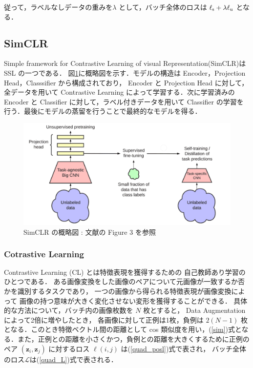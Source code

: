 従って，ラベルなしデータの重みを$\lambda$	として，バッチ全体のロスは ${\ell}_{\rm s}+\lambda {\ell}_{\rm u}$ となる．

\changeindent{0cm}
\subsection{SimCLR}
\changeindent{2cm}
Simple framework for Contrastive Learning of visual Representation(SimCLR)\cite{chen2020simple}は SSL の一つである．
図\ref{fig:SimCLR}に概略図を示す．モデルの構造は Encoder，Projection Head，Classsifier
から構成されており， Encoder と Projection Head に対して，全データを用いて Contrastive Learning によって学習する．次に学習済みの Encoder と Classifier に対して，ラベル付きデータを用いて Classifier の学習を行う．最後にモデルの蒸留\cite{hinton2015distilling}を行うことで最終的なモデルを得る．

\begin{figure}[h]
	\begin{center}
		\includegraphics[scale=1.0]{./images/SimCLR.png}
		\caption[SimCLR の概略図]
		{SimCLR の概略図 : 文献\cite{chen2020big}の Figure 3 を参照\label{fig:SimCLR}}
	\end{center}
\end{figure}

\changeindent{0cm}
\subsubsection{Cotrastive Learning}
\changeindent{2cm}
Contrastive Learning (CL)\cite{tian2020makes} とは特徴表現を獲得するための
自己教師あり学習\cite{doersch2017multi}のひとつである．
ある画像変換をした画像のペアについて元画像が一致するか否かを識別するタスクであり，
一つの画像から得られる特徴表現が画像変換によって
画像の持つ意味が大きく変化させない変形を獲得することができる．
具体的な方法について，バッチ内の画像枚数を $N$ 枚とすると， Data Augmentation によって2倍に増やしたとき，
各画像に対して正例は1枚，負例は $2(N-1)$ 枚となる．このとき特徴ベクトル間の距離として cos 類似度を用い，(\ref{sim})式となる．また，正例との距離を小さくかつ，負例との距離を大きくするために正例のペア $({\bm z}_i,{\bm z}_j)$ に対するロス $\ell(i, j)$ は(\ref{quad_posl})式で表され，
バッチ全体のロス$\mathcal L$は(\ref{quad_L})式で表される．

